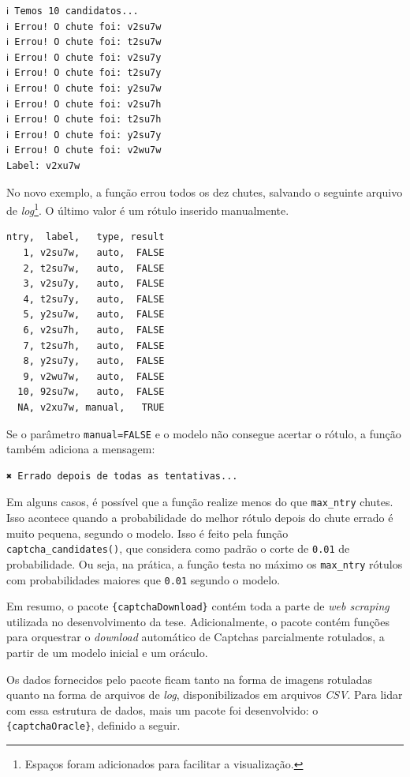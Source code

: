 \documentclass[12pt,twoside,brazilian]{book}
\begin{document}
\begin{verbatim}
ℹ Temos 10 candidatos...
ℹ Errou! O chute foi: v2su7w
ℹ Errou! O chute foi: t2su7w
ℹ Errou! O chute foi: v2su7y
ℹ Errou! O chute foi: t2su7y
ℹ Errou! O chute foi: y2su7w
ℹ Errou! O chute foi: v2su7h
ℹ Errou! O chute foi: t2su7h
ℹ Errou! O chute foi: y2su7y
ℹ Errou! O chute foi: v2wu7w
Label: v2xu7w
\end{verbatim}

No novo exemplo, a função errou todos os dez chutes, salvando o seguinte
arquivo de \emph{log}\footnote{Espaços foram adicionados para facilitar
  a visualização.}. O último valor é um rótulo inserido manualmente.

\begin{verbatim}
ntry,  label,   type, result
   1, v2su7w,   auto,  FALSE
   2, t2su7w,   auto,  FALSE
   3, v2su7y,   auto,  FALSE
   4, t2su7y,   auto,  FALSE
   5, y2su7w,   auto,  FALSE
   6, v2su7h,   auto,  FALSE
   7, t2su7h,   auto,  FALSE
   8, y2su7y,   auto,  FALSE
   9, v2wu7w,   auto,  FALSE
  10, 92su7w,   auto,  FALSE
  NA, v2xu7w, manual,   TRUE
\end{verbatim}

Se o parâmetro \texttt{manual=FALSE} e o modelo não consegue acertar o
rótulo, a função também adiciona a mensagem:

\begin{verbatim}
✖ Errado depois de todas as tentativas...
\end{verbatim}

Em alguns casos, é possível que a função realize menos do que
\texttt{max\_ntry} chutes. Isso acontece quando a probabilidade do
melhor rótulo depois do chute errado é muito pequena, segundo o modelo.
Isso é feito pela função \texttt{captcha\_candidates()}, que considera
como padrão o corte de \texttt{0.01} de probabilidade. Ou seja, na
prática, a função testa no máximo os \texttt{max\_ntry} rótulos com
probabilidades maiores que \texttt{0.01} segundo o modelo.

Em resumo, o pacote \texttt{\{captchaDownload\}} contém toda a parte de
\emph{web scraping} utilizada no desenvolvimento da tese.
Adicionalmente, o pacote contém funções para orquestrar o
\emph{download} automático de Captchas parcialmente rotulados, a partir
de um modelo inicial e um oráculo.

Os dados fornecidos pelo pacote ficam tanto na forma de imagens
rotuladas quanto na forma de arquivos de \emph{log}, disponibilizados em
arquivos \emph{CSV}. Para lidar com essa estrutura de dados, mais um
pacote foi desenvolvido: o \texttt{\{captchaOracle\}}, definido a
seguir.
\end{document}
